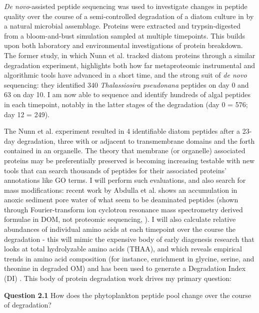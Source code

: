 \documentclass[12pt, letterpaper, twoside]{article}
\begin{document}
\textit{De novo}-assisted peptide sequencing was used to investigate changes in peptide quality over the course of a semi-controlled degradation of a diatom culture in by a natural microbial assemblage. Proteins were extracted and trypsin-digested from a bloom-and-bust simulation sampled at multiple timepoints. This builds upon both laboratory \cite{nunn_path_2010} and environmental investigations \cite{moore_identifying_2012} of protein breakdown. The former study, in which Nunn et al. tracked diatom proteins through a similar degradation experiment, highlights both how far metaproteomic instrumental and algorithmic tools have advanced in a short time, and the strong suit of \textit{de novo} sequencing: they identified 340 \textit{Thalassiosira pseudonana} peptides on day 0 and 63 on day 10. I am now able to sequence and identify hundreds of algal peptides in each timepoint, notably in the latter stages of the degradation (day 0 = 576; day 12 = 249). 

The Nunn et al. experiment resulted in 4 identifiable diatom peptides after a 23-day degradation, three with or adjacent to transmembrane domains and the forth contained in an organelle. The theory that membrane (or organelle) associated proteins may be preferentially preserved \cite{wolfe_first_2006} is becoming increasing testable with new tools that can search thousands of peptides for their associated proteins' annotations like GO terms. I will perform such evaluations, and also search for mass modifications: recent work by Abdulla et al. shows an accumulation in anoxic sediment pore water of what seem to be deaminated peptides (shown through Fourier-transform ion cyclotron resonance mass spectrometry derived formulae in DOM, not proteomic sequencing, \cite{abdulla_accumulation_2018}). I will also calculate relative abundances of individual amino acids at each timepoint over the course the degradation - this will mimic the expensive body of early diagenesis research that looks at total hydrolyzable amino acids (THAA), and which reveals empirical trends in amino acid composition (for instance, enrichment in glycine, serine, and theonine in degraded OM) and has been used to generate a Degradation Index (DI) \cite{dauwe_amino_1998}. This body of protein degradation work drives my primary question:

\bigskip

\textbf{Question 2.1} How does the phytoplankton peptide pool change over the course of degradation?

\bigskip
\end{document}
